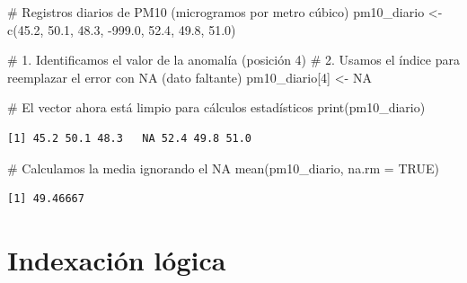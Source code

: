 \documentclass[
  ignorenonframetext,
  aspectratio=169,
  spanish,
]{beamer}
\newenvironment{Shaded}{\begin{snugshade}}{\end{snugshade}}
\newcommand{\AttributeTok}[1]{\textcolor[rgb]{0.40,0.45,0.13}{#1}}
\newcommand{\CommentTok}[1]{\textcolor[rgb]{0.37,0.37,0.37}{#1}}
\newcommand{\ConstantTok}[1]{\textcolor[rgb]{0.56,0.35,0.01}{#1}}
\newcommand{\DecValTok}[1]{\textcolor[rgb]{0.68,0.00,0.00}{#1}}
\newcommand{\FloatTok}[1]{\textcolor[rgb]{0.68,0.00,0.00}{#1}}
\newcommand{\FunctionTok}[1]{\textcolor[rgb]{0.28,0.35,0.67}{#1}}
\newcommand{\NormalTok}[1]{\textcolor[rgb]{0.00,0.23,0.31}{#1}}
\newcommand{\OtherTok}[1]{\textcolor[rgb]{0.00,0.23,0.31}{#1}}
\newcommand{\SpecialCharTok}[1]{\textcolor[rgb]{0.37,0.37,0.37}{#1}}
\begin{document}
\begin{frame}[fragile]{}
\label{section-1}
\begin{Shaded}
\begin{Highlighting}[]
\CommentTok{\# Registros diarios de PM10 (microgramos por metro cúbico)}
\NormalTok{pm10\_diario }\OtherTok{\textless{}{-}} \FunctionTok{c}\NormalTok{(}\FloatTok{45.2}\NormalTok{, }\FloatTok{50.1}\NormalTok{, }\FloatTok{48.3}\NormalTok{, }\SpecialCharTok{{-}}\FloatTok{999.0}\NormalTok{, }\FloatTok{52.4}\NormalTok{, }\FloatTok{49.8}\NormalTok{, }\FloatTok{51.0}\NormalTok{)}

\CommentTok{\# 1. Identificamos el valor de la anomalía (posición 4)}
\CommentTok{\# 2. Usamos el índice para reemplazar el error con NA (dato faltante)}
\NormalTok{pm10\_diario[}\DecValTok{4}\NormalTok{] }\OtherTok{\textless{}{-}} \ConstantTok{NA}
\end{Highlighting}
\end{Shaded}
\end{frame}

\begin{frame}[fragile]{}
\label{section-2}
\begin{Shaded}
\begin{Highlighting}[]
\CommentTok{\# El vector ahora está limpio para cálculos estadísticos}
\FunctionTok{print}\NormalTok{(pm10\_diario)}
\end{Highlighting}
\end{Shaded}

\begin{verbatim}
[1] 45.2 50.1 48.3   NA 52.4 49.8 51.0
\end{verbatim}

\begin{Shaded}
\begin{Highlighting}[]
\CommentTok{\# Calculamos la media ignorando el NA}
\FunctionTok{mean}\NormalTok{(pm10\_diario, }\AttributeTok{na.rm =} \ConstantTok{TRUE}\NormalTok{)}
\end{Highlighting}
\end{Shaded}

\begin{verbatim}
[1] 49.46667
\end{verbatim}
\end{frame}

\section{Indexación lógica}\label{indexaciuxf3n-luxf3gica}
\end{document}
